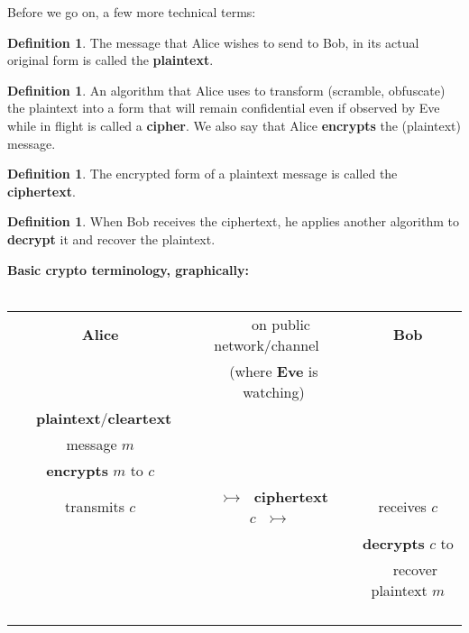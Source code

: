 \documentclass[12pt,letterpaper]{amsbook}
\theoremstyle{definition}
\newtheorem{definition}[theorem]{Definition}
\theoremstyle{remark}
\numberwithin{figure}{section}
\numberwithin{exercise}{chapter}
\numberwithin{section}{chapter}
\numberwithin{equation}{section}
\numberwithin{table}{subsection}
\begin{document}
Before we go on, a few more technical terms:
\begin{definition}
\label{def:clearplaintext}
The message that Alice wishes to send to Bob, in its actual original form is
called the {\bf plaintext}.
\end{definition}
\begin{definition}\label{def:encryptioncipher}
An algorithm that Alice uses to transform (scramble, obfuscate) the plaintext
into a form that will remain confidential even if observed by Eve while in
flight is called a {\bf cipher}.  We also say that Alice {\bf encrypts} the
(plaintext) message.
\end{definition}
\begin{definition}\label{def:ciphertext}
The encrypted form of a plaintext message is called the {\bf ciphertext}.
\end{definition}
\begin{definition}\label{def:decrypt}
When Bob receives the ciphertext, he applies another algorithm to
\textbf{decrypt}
it and recover the plaintext.
\end{definition}

\begin{center}
  {\large\textbf{Basic crypto terminology, graphically:}}\\
  \ \\
  \begin{tabular}{|c|c|c|}
    \hline
    \textbf{Alice}  &\ \ on public network/channel\ \ & \textbf{Bob} \\
    & (where \textbf{Eve} is watching) & \\
    \hline
    \ \ \ {\bf plaintext}/{\bf cleartext}\ \  & & \\
    message $m$  & & \\
    {\bf encrypts} $m$ to $c$& &\\
    transmits $c$ & \ \quad$\rightarrowtail\ \ \ ${\bf ciphertext}\ $c\ \ \ \rightarrowtail$\quad\  & receives $c$\\
    & & {\bf decrypts} $c$ to\\
    & &\ \  recover plaintext $m$\ \ \ \\
    \hline
  \end{tabular}\\
  \ \\
\end{center}
\end{document}
